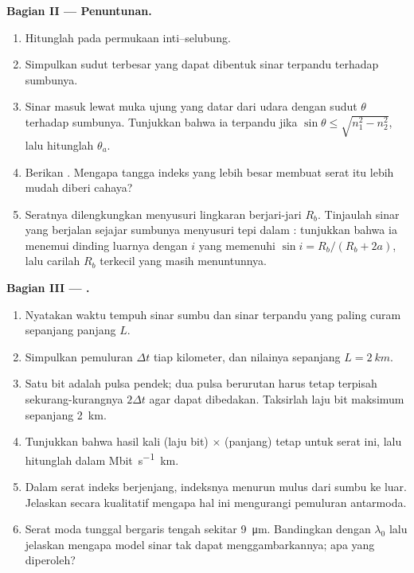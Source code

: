 \begin{problem}
\medskip
\noindent\textbf{Bagian II --- Penuntunan.}
\begin{enumerate}[resume]
  \item Hitunglah  pada permukaan inti--selubung.
  \item Simpulkan sudut terbesar yang dapat dibentuk sinar terpandu
        terhadap sumbunya.
  \item Sinar masuk lewat muka ujung yang datar dari udara dengan sudut
        $\theta$ terhadap sumbunya. Tunjukkan bahwa ia terpandu jika
        $\sin\theta \leq
        \sqrt{n_1^2 - n_2^2}$, lalu hitunglah 
        $\theta_a$.
  \item Berikan . Mengapa tangga indeks yang lebih
        besar membuat serat itu lebih mudah diberi cahaya?
  \item Seratnya dilengkungkan menyusuri lingkaran berjari-jari $R_b$.
        Tinjaulah sinar yang berjalan sejajar sumbunya menyusuri tepi
        dalam : tunjukkan bahwa ia menemui dinding luarnya dengan
         $i$ yang memenuhi $\sin i = R_b/(R_b + 2a)$, lalu
        carilah $R_b$ terkecil yang masih menuntunnya.
\end{enumerate}

\medskip
\noindent\textbf{Bagian III --- .}
\begin{enumerate}[resume]
  \item Nyatakan waktu tempuh sinar sumbu dan sinar terpandu yang paling
        curam sepanjang panjang $L$.
  \item Simpulkan pemuluran $\Delta t$ tiap kilometer, dan nilainya
        sepanjang $L = \qty{2}{km}$.
  \item Satu bit adalah pulsa pendek; dua pulsa berurutan harus tetap
        terpisah sekurang-kurangnya $2\Delta t$ agar dapat dibedakan.
        Taksirlah laju bit maksimum sepanjang \qty{2}{km}.
  \item Tunjukkan bahwa hasil kali (laju bit) $\times$ (panjang) tetap
        untuk serat ini, lalu hitunglah dalam \unit{Mbit.s^{-1}.km}.
  \item Dalam serat indeks berjenjang, indeksnya menurun mulus dari
        sumbu ke luar. Jelaskan secara kualitatif mengapa hal ini
        mengurangi pemuluran antarmoda.
  \item Serat moda tunggal bergaris tengah  sekitar \qty{9}{\micro m}.
        Bandingkan dengan $\lambda_0$ lalu jelaskan mengapa model sinar
        tak dapat menggambarkannya; apa yang diperoleh?
\end{enumerate}


\end{problem}
